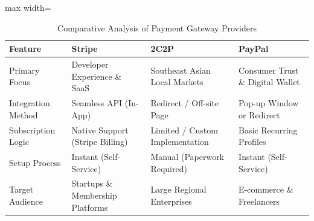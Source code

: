 \begin{table}[htbp]
\centering
\caption{Comparative Analysis of Payment Gateway Providers}
\label{tab:payment-comparison}
\footnotesize
\renewcommand{\arraystretch}{1.4}
\begin{adjustbox}{max width=\textwidth}
\begin{tabular}{|>{\raggedright\arraybackslash}p{3cm}|>{\raggedright\arraybackslash}p{3.5cm}|>{\raggedright\arraybackslash}p{3.5cm}|>{\raggedright\arraybackslash}p{3.5cm}|}
\hline
\textbf{Feature} & \textbf{Stripe} & \textbf{2C2P} & \textbf{PayPal} \\
\hline
Primary Focus
  & Developer Experience \& SaaS
  & Southeast Asian Local Markets
  & Consumer Trust \& Digital Wallet \\
\hline
Integration Method
  & Seamless API (In-App)
  & Redirect / Off-site Page
  & Pop-up Window or Redirect \\
\hline
Subscription Logic
  & Native Support (Stripe Billing)
  & Limited / Custom Implementation
  & Basic Recurring Profiles \\
\hline
Setup Process
  & Instant (Self-Service)
  & Manual (Paperwork Required)
  & Instant (Self-Service) \\
\hline
Target Audience
  & Startups \& Membership Platforms
  & Large Regional Enterprises
  & E-commerce \& Freelancers \\
\hline
\end{tabular}
\end{adjustbox}
\end{table}
